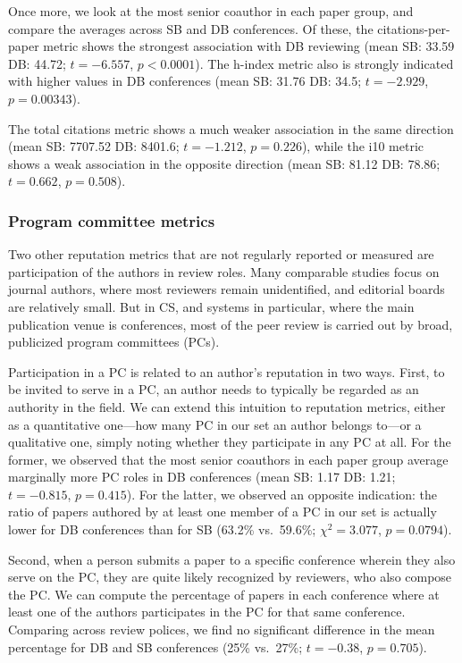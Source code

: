 \documentclass[12pt]{article}
\begin{document}
Once more, we look at the most senior coauthor in each paper group, and compare the averages across SB and DB conferences.
Of these, the citations-per-paper metric shows the strongest association with DB reviewing
(mean SB: 33.59 DB: 44.72; \(t=-6.557\), \(p<0.0001\)).
The h-index metric also is strongly indicated with higher values in DB conferences
(mean SB: 31.76 DB: 34.5; \(t=-2.929\), \(p=0.00343\)).

The total citations metric shows a much weaker association in the same direction
(mean SB: 7707.52 DB: 8401.6; \(t=-1.212\), \(p=0.226\)),
while the i10 metric shows a weak association in the opposite direction
(mean SB: 81.12 DB: 78.86; \(t=0.662\), \(p=0.508\)).

\hypertarget{program-committee-metrics}{%
\subsubsection{Program committee metrics}\label{program-committee-metrics}}

Two other reputation metrics that are not regularly reported or measured are participation of the authors in review roles.
Many comparable studies focus on journal authors, where most reviewers remain unidentified, and editorial boards are relatively small.
But in CS, and systems in particular, where the main publication venue is conferences, most of the peer review is carried out by broad, publicized program committees (PCs).

Participation in a PC is related to an author's reputation in two ways.
First, to be invited to serve in a PC, an author needs to typically be regarded as an authority in the field.
We can extend this intuition to reputation metrics, either as a quantitative one---how many PC in our set an author belongs to---or a qualitative one, simply noting whether they participate in any PC at all.
For the former, we observed that the most senior coauthors in each paper group average marginally more PC roles in DB conferences
(mean SB: 1.17 DB: 1.21; \(t=-0.815\), \(p=0.415\)).
For the latter, we observed an opposite indication: the ratio of papers authored by at least one member of a PC in our set is actually lower for DB conferences than for SB
(63.2\%
vs.~59.6\%;
\(\chi{}^2=3.077\), \(p=0.0794\)).

Second, when a person submits a paper to a specific conference wherein they also serve on the PC, they are quite likely recognized by reviewers, who also compose the PC.
We can compute the percentage of papers in each conference where at least one of the authors participates in the PC for that same conference.
Comparing across review polices, we find no significant difference in the mean percentage for DB and SB conferences
(25\%
vs.~27\%;
\(t=-0.38\), \(p=0.705\)).
\end{document}
